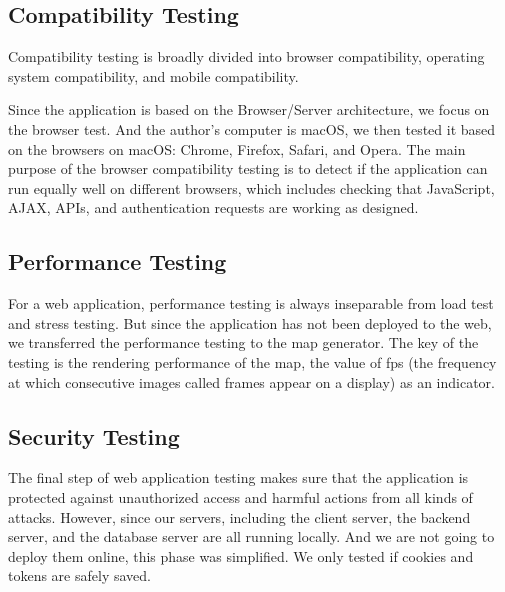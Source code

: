 \subsection{Compatibility Testing}
Compatibility testing is broadly divided into browser compatibility, operating system compatibility, and mobile compatibility.

Since the application is based on the Browser/Server architecture, we focus on the browser test. And the author's computer is macOS, we then tested it based on the browsers on macOS: Chrome, Firefox, Safari, and Opera. The main purpose of the browser compatibility testing is to detect if the application can run equally well on different browsers, which includes checking that JavaScript, AJAX, APIs, and authentication requests are working as designed.

\subsection{Performance Testing}
For a web application, performance testing is always inseparable from load test and stress testing. But since the application has not been deployed to the web, we transferred the performance testing to the map generator. The key of the testing is the rendering performance of the map, the value of fps (the frequency at which consecutive images called frames appear on a display) as an indicator.

\subsection{Security Testing}
The final step of web application testing makes sure that the application is protected against unauthorized access and harmful actions from all kinds of attacks. However, since our servers, including the client server, the backend server, and the database server are all running locally. And we are not going to deploy them online, this phase was simplified. We only tested if cookies and tokens are safely saved.
